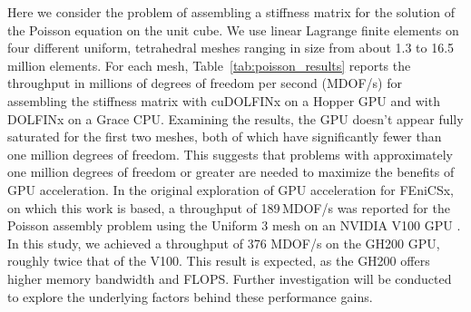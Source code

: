 Here we consider the problem of assembling a stiffness matrix for the solution of the Poisson equation on the unit cube. We use linear Lagrange finite elements on four different uniform, tetrahedral meshes ranging in size from about 1.3 to 16.5 million elements.  For each mesh, Table~\ref{tab:poisson_results} reports the throughput in millions of degrees of freedom per second (MDOF/s) for assembling the stiffness matrix with cuDOLFINx on a Hopper  GPU and with DOLFINx on a Grace CPU. Examining the results, the GPU doesn't appear fully saturated for the first two meshes, both of which have significantly fewer than one million degrees of freedom. This suggests that problems with approximately one million degrees of freedom or greater are needed to maximize the benefits of GPU acceleration. In the original exploration of GPU acceleration for FEniCSx, on which this work is based, a throughput of 189\,MDOF/s was reported for the Poisson assembly problem using the Uniform 3 mesh on an NVIDIA V100 GPU \citep{trotter2023targeting}. In this study, we achieved a throughput of 376 MDOF/s on the GH200 GPU, roughly twice that of the V100. This result is expected, as the GH200 offers higher memory bandwidth and FLOPS. Further investigation will be conducted to explore the underlying factors behind these performance gains.

